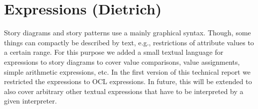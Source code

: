 \section{Expressions (Dietrich)} \label{sec:Expressions}

Story diagrams and story patterns use a mainly graphical syntax.
Though, some things can compactly be described by text, e.g., restrictions of attribute values to a certain range.
For this purpose we added a small textual language for expressions to story diagrams
to cover value comparisons, value assignments, simple arithmetic expressions, etc.
In the first version of this technical report we restricted the expressions to OCL expressions.
In future, this will be extended to also cover arbitrary other textual expressions that have to be interpreted by a given interpreter.